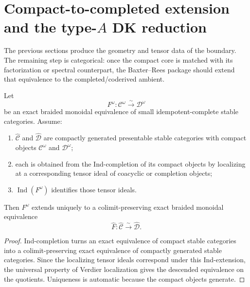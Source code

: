 \section{Compact-to-completed extension and the type-$A$ DK reduction}
\label{sec:typeA-DK-reduction}

The previous sections produce the geometry and tensor data of the
boundary. The remaining step is categorical: once the compact core is
matched with its factorization or spectral counterpart, the Baxter--Rees
package should extend that equivalence to the completed/coderived ambient.

\begin{theorem}
\ClaimStatusProvedHere
\label{thm:compact-to-completed-extension-principle}
Let
\begin{equation}
F^\omega:\mathcal C^\omega\xrightarrow{\sim}\mathcal D^\omega
\end{equation}
be an exact braided monoidal equivalence of small idempotent-complete
stable categories. Assume:
\begin{enumerate}
 \item $\widehat{\mathcal C}$ and $\widehat{\mathcal D}$ are compactly
 generated presentable stable categories with compact objects
 $\mathcal C^\omega$ and $\mathcal D^\omega$;
 \item each is obtained from the Ind-completion of its compact objects
 by localizing at a corresponding tensor ideal of coacyclic or
 completion objects;
 \item $\operatorname{Ind}(F^\omega)$ identifies those tensor ideals.
\end{enumerate}
Then $F^\omega$ extends uniquely to a colimit-preserving exact braided
monoidal equivalence
\begin{equation}
\widehat F:\widehat{\mathcal C}\xrightarrow{\sim}\widehat{\mathcal D}.
\end{equation}
\end{theorem}

\begin{proof}
Ind-completion turns an exact equivalence of compact stable categories
into a colimit-preserving exact equivalence of compactly generated stable
categories. Since the localizing tensor ideals correspond under this
Ind-extension, the universal property of Verdier localization gives the
descended equivalence on the quotients. Uniqueness is automatic because
the compact objects generate.
\end{proof}

